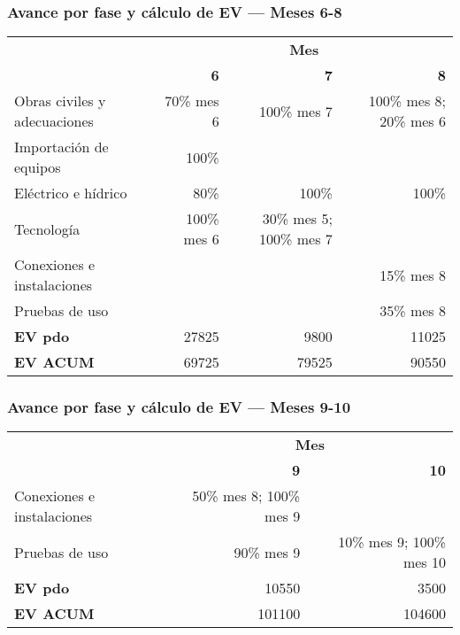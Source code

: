 \subsubsection*{Avance por fase y cálculo de EV — Meses 6-8}
\begin{table}[H]\centering\small
\begin{tabular}{lrrr}
\toprule
 & \multicolumn{3}{c}{\textbf{Mes}} \\
\cmidrule(lr){2-4}
 & \textbf{6} & \textbf{7} & \textbf{8} \\
\midrule
Obras civiles y adecuaciones & 70\% mes 6 & 100\% mes 7 & 100\% mes 8; 20\% mes 6 \\
Importación de equipos       & 100\%      &             &             \\
Eléctrico e hídrico          & 80\%       & 100\%       & 100\%       \\
Tecnología                   & 100\% mes 6 & 30\% mes 5; 100\% mes 7 &   \\
Conexiones e instalaciones   &            &             & 15\% mes 8  \\
Pruebas de uso               &            &             & 35\% mes 8  \\
\midrule
\textbf{EV pdo}  & 27825 & 9800 & 11025 \\
\textbf{EV ACUM} & 69725 & 79525 & 90550 \\
\bottomrule
\end{tabular}
\end{table}

\subsubsection*{Avance por fase y cálculo de EV — Meses 9-10}
\begin{table}[H]\centering\small
\begin{tabular}{lrr}
\toprule
 & \multicolumn{2}{c}{\textbf{Mes}} \\
\cmidrule(lr){2-3}
 & \textbf{9} & \textbf{10} \\
\midrule
Conexiones e instalaciones & 50\% mes 8; 100\% mes 9 &  \\
Pruebas de uso            & 90\% mes 9               & 10\% mes 9; 100\% mes 10 \\
\midrule
\textbf{EV pdo}  & 10550 & 3500 \\
\textbf{EV ACUM} & 101100 & 104600 \\
\bottomrule
\end{tabular}
\end{table}

